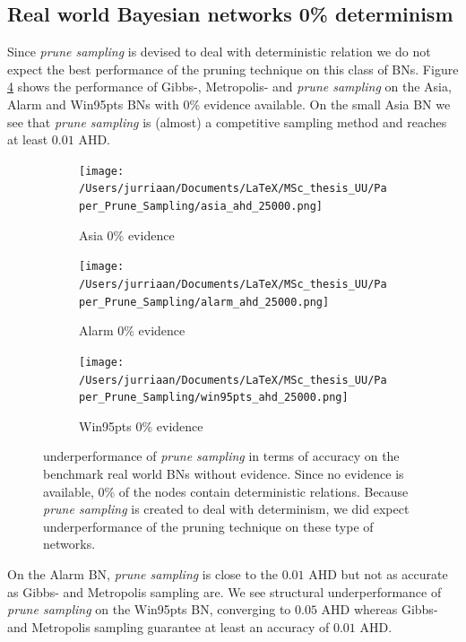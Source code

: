 \documentclass[a4paper, twoside, 11pt]{report}
\theoremstyle{plain}
\theoremstyle{definition}
\theoremstyle{remark}
\newcommand{\ps}{\textit{prune sampling }}
\begin{document}
\subsection{Real world Bayesian networks 0\% determinism}\label{real_world_0_ev}
Since \ps is devised to deal with deterministic relation we do not expect the best performance of the pruning technique on this class of BNs. Figure \ref{results1} shows the performance of Gibbs-, Metropolis- and \ps on the Asia, Alarm and Win95pts BNs with 0\% evidence available. On the small Asia BN we see that \ps is (almost) a competitive sampling method and reaches at least $0.01$ AHD. 
\begin{figure}[H]
\centering
\begin{subfigure}{0.5\textwidth}
\texttt{[image: /Users/jurriaan/Documents/LaTeX/MSc\_thesis\_UU/Paper\_Prune\_Sampling/asia\_ahd\_25000.png]}
\caption{Asia 0\% evidence}%
\label{asia}%
\end{subfigure}\hfill%
\begin{subfigure}{0.5\textwidth}
\texttt{[image: /Users/jurriaan/Documents/LaTeX/MSc\_thesis\_UU/Paper\_Prune\_Sampling/alarm\_ahd\_25000.png]}
\caption{Alarm 0\% evidence}%
\label{alarm}%
\end{subfigure}%
\begin{subfigure}{0.5\textwidth}
\texttt{[image: /Users/jurriaan/Documents/LaTeX/MSc\_thesis\_UU/Paper\_Prune\_Sampling/win95pts\_ahd\_25000.png]}
\caption{Win95pts 0\% evidence}%
\label{win95pts}%
\end{subfigure}\hfill%
\vspace{0.75pc}
\caption{underperformance of \ps in terms of accuracy on the benchmark real world BNs without evidence. Since no evidence is available, 0\% of the nodes contain deterministic relations. Because \ps is created to deal with determinism, we did expect underperformance of the pruning technique on these type of networks.  }
\label{results1}
\end{figure}
On the Alarm BN, \ps is close to the $0.01$ AHD but not as accurate as Gibbs- and Metropolis sampling are. We see structural underperformance of \ps on the Win95pts BN, converging to $0.05$ AHD whereas Gibbs- and Metropolis sampling guarantee at least an accuracy of $0.01$ AHD.
\end{document}
